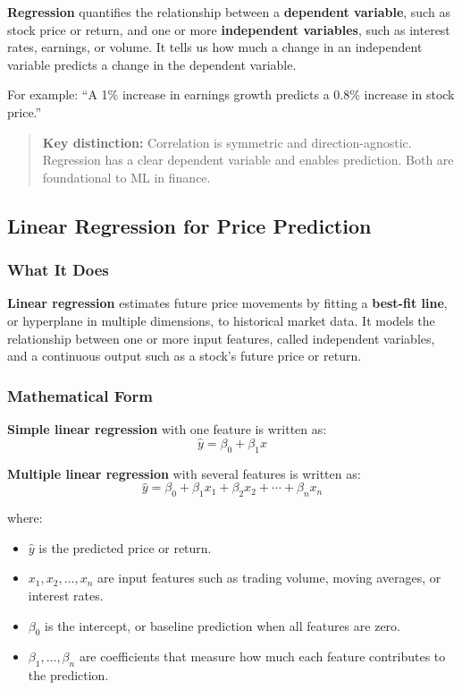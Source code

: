 \documentclass[12pt,openany]{book}
\begin{document}
\textbf{Regression} quantifies the relationship between a \textbf{dependent variable}, such as stock price or return, and one or more \textbf{independent variables}, such as interest rates, earnings, or volume. It tells us how much a change in an independent variable predicts a change in the dependent variable.

For example: ``A 1\% increase in earnings growth predicts a 0.8\% increase in stock price.''

\begin{quote}
\textbf{Key distinction:} Correlation is symmetric and direction-agnostic. Regression has a clear dependent variable and enables prediction. Both are foundational to ML in finance.
\end{quote}

\subsection{Linear Regression for Price Prediction}

\subsubsection{What It Does}

\textbf{Linear regression} estimates future price movements by fitting a \textbf{best-fit line}, or hyperplane in multiple dimensions, to historical market data. It models the relationship between one or more input features, called independent variables, and a continuous output such as a stock's future price or return.

\subsubsection{Mathematical Form}

\textbf{Simple linear regression} with one feature is written as:
\begin{equation*}
    \hat{y} = \beta_0 + \beta_1 x
\end{equation*}

\textbf{Multiple linear regression} with several features is written as:
\begin{equation*}
    \hat{y} = \beta_0 + \beta_1 x_1 + \beta_2 x_2 + \cdots + \beta_n x_n
\end{equation*}

where:
\begin{itemize}[leftmargin=*]
    \item \(\hat{y}\) is the predicted price or return.
    \item \(x_1, x_2, \ldots, x_n\) are input features such as trading volume, moving averages, or interest rates.
    \item \(\beta_0\) is the intercept, or baseline prediction when all features are zero.
    \item \(\beta_1, \ldots, \beta_n\) are coefficients that measure how much each feature contributes to the prediction.
\end{itemize}
\end{document}
